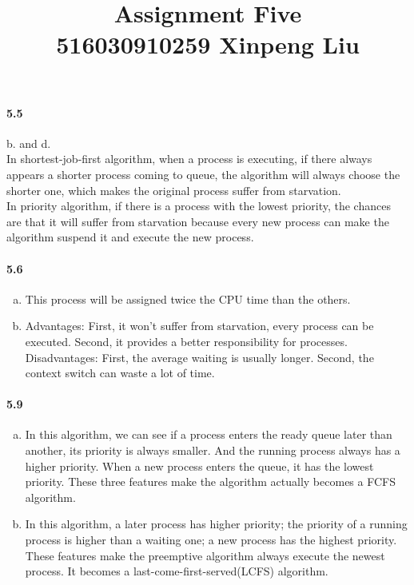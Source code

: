 \documentclass[12pt,a4]{article}
\date{}
\title{
	Assignment Five\\
	\vspace{3mm}
	{\normalsize 516030910259 \textbf{Xinpeng Liu}}
}
\begin{document}
    \maketitle
	\paragraph{5.5} 
		b. and d. \\
		In shortest-job-first algorithm, when a process is executing, if there always appears a shorter process coming to queue, the algorithm will always choose the shorter one, which makes the original process suffer from starvation. \\
		In priority algorithm, if there is a process with the lowest priority, the chances are that it will suffer from starvation because every new process can make the algorithm suspend it and execute the new process.
	\paragraph{5.6} 
		\begin{enumerate}[a.]
			\item This process will be assigned twice the CPU time than the others.
			\item 
				Advantages: First, it won't suffer from starvation, every process can be executed. Second, it provides a better responsibility for processes.\\
				Disadvantages: First, the average waiting is usually longer. Second, the context switch can waste a lot of time. 
		\end{enumerate}
	\paragraph{5.9} 
		\begin{enumerate}[a.]
			\item In this algorithm, we can see if a process enters the ready queue later than another, its priority is always smaller. And the running process always has a higher priority. When a new process enters the queue, it has the lowest priority. These three features make the algorithm actually becomes a FCFS algorithm.
			\item In this algorithm, a later process has higher priority; the priority of a running process is higher than a waiting one; a new process has the highest priority. These features make the preemptive algorithm always execute the newest process. It becomes a last-come-first-served(LCFS) algorithm.
		\end{enumerate}
\end{document}
